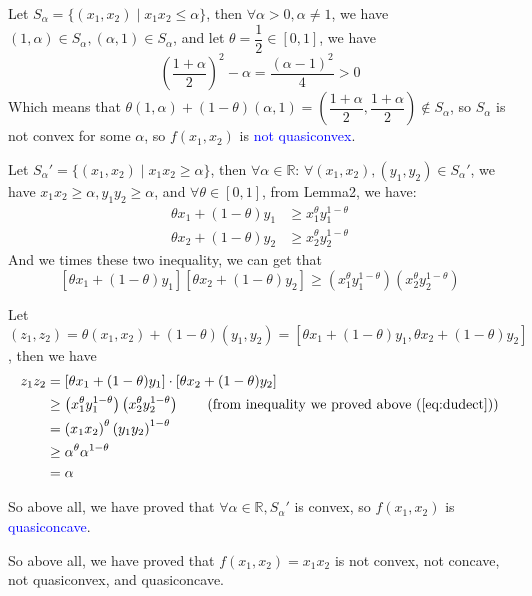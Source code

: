 \begin{itemize}
Let $S_{\alpha}=\{(x_1,x_2)\mid x_1x_2\leq\alpha\}$, then $\forall\alpha > 0, \alpha\neq 1$, we have $(1,\alpha)\in S_{\alpha}, (\alpha,1)\in S_{\alpha}$, and let $\theta=\dfrac{1}{2}\in[0,1]$, we have
$$\left(\dfrac{1+\alpha}{2}\right)^2-\alpha = \dfrac{(\alpha-1)^2}{4} > 0$$
Which means that $\theta(1,\alpha)+(1-\theta)(\alpha,1)=\left(\dfrac{1+\alpha}{2},\dfrac{1+\alpha}{2}\right)\notin S_{\alpha}$, so $S_{\alpha}$ is not convex for some $\alpha$, so $f(x_1,x_2)$ is \textcolor{blue}{not quasiconvex}.

Let $S_{\alpha}'=\{(x_1,x_2)\mid x_1x_2\geq\alpha\}$, then $\forall\alpha\in\mathbb{R}$: $\forall (x_1,x_2),(y_1,y_2)\in S_{\alpha}'$, we have $x_1x_2\geq\alpha, y_1y_2\geq\alpha$, and $\forall \theta\in[0,1]$, from Lemma2, we have:
\begin{align*}
\theta x_1 + (1-\theta)y_1 &\geq x_1^{\theta}y_1^{1-\theta} \\
\theta x_2 + (1-\theta)y_2 &\geq x_2^{\theta}y_2^{1-\theta}
\end{align*}
And we times these two inequality, we can get that
\begin{equation}
\left[\theta x_1 + (1-\theta)y_1\right]\left[\theta x_2 + (1-\theta)y_2\right] \geq \left(x_1^{\theta}y_1^{1-\theta}\right)\left(x_2^{\theta}y_2^{1-\theta}\right)
\label{eq:dudect}
\end{equation}

Let $\left(z_1,z_2\right)=\theta\left(x_1,x_2\right)+(1-\theta)\left(y_1,y_2\right)=\left[\theta x_1 + (1-\theta)y_1, \theta x_2 + (1-\theta)y_2\right]$, then we have
\begin{align*}
z_1z_2 &= \left[\theta x_1 + (1-\theta)y_1\right] \cdot \left[\theta x_2 + (1-\theta)y_2\right] \\
&\geq \left(x_1^{\theta}y_1^{1-\theta}\right)\left(x_2^{\theta}y_2^{1-\theta}\right) \text{\quad\quad (from inequality we proved above (\ref{eq:dudect}))}\\
&= \left(x_1x_2\right)^{\theta}\left(y_1y_2\right)^{1-\theta} \\
&\geq \alpha^{\theta}\alpha^{1-\theta} \\
&= \alpha
\end{align*}

So above all, we have proved that $\forall\alpha\in\mathbb{R}, S_{\alpha}'$ is convex, so $f(x_1,x_2)$ is \textcolor{blue}{quasiconcave}.

So above all, we have proved that $f(x_1,x_2)=x_1x_2$ is not convex, not concave, not quasiconvex, and quasiconcave.



\end{itemize}

